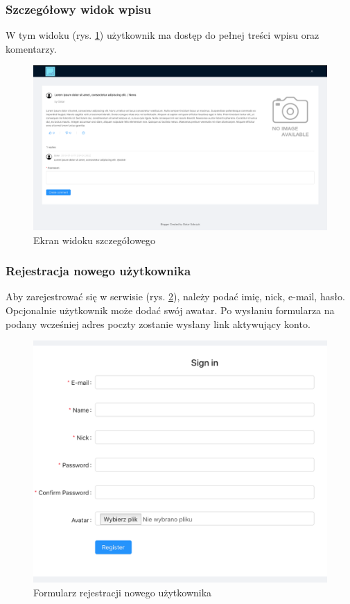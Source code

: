 \documentclass[declaration,shortabstract]{iithesis}
\begin{document}
\subsubsection{Szczegółowy widok wpisu}
W tym widoku (rys. \ref{fig:post_view}) użytkownik ma dostęp do pełnej treści wpisu oraz komentarzy.

\begin{figure}
    \centering
    \includegraphics[width=\textwidth]{images/widok_postu.png}
    \caption{Ekran widoku szczegółowego}
    \label{fig:post_view}
\end{figure}

\subsubsection{Rejestracja nowego użytkownika}
Aby zarejestrować się w serwisie (rys. \ref{fig:register}), należy podać imię, nick, e-mail, hasło. Opcjonalnie użytkownik może dodać swój awatar. Po wysłaniu formularza na podany wcześniej adres poczty zostanie wysłany link aktywujący konto.

\begin{figure}
    \centering
    \includegraphics[width=\textwidth]{images/rejestracja.png}
    \caption{Formularz rejestracji nowego użytkownika}
    \label{fig:register}
\end{figure}
\end{document}
